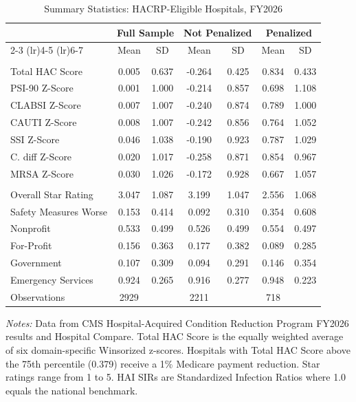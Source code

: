 \begin{table}[t]
\centering
\caption{Summary Statistics: HACRP-Eligible Hospitals, FY2026}
\label{tab:sumstats}
\begin{threeparttable}
\small
\begin{tabular}{lcccccc}
\toprule
& \multicolumn{2}{c}{Full Sample} & \multicolumn{2}{c}{Not Penalized} & \multicolumn{2}{c}{Penalized} \\
\cmidrule(lr){2-3} \cmidrule(lr){4-5} \cmidrule(lr){6-7}
& Mean & SD & Mean & SD & Mean & SD \\
\midrule
\addlinespace[3pt]
\multicolumn{7}{l}{\textit{Panel A: HAC Scores}} \\
\addlinespace[2pt]
Total HAC Score & 0.005 & 0.637 & -0.264 & 0.425 & 0.834 & 0.433 \\
PSI-90 Z-Score & 0.001 & 1.000 & -0.214 & 0.857 & 0.698 & 1.108 \\
CLABSI Z-Score & 0.007 & 1.007 & -0.240 & 0.874 & 0.789 & 1.000 \\
CAUTI Z-Score & 0.008 & 1.007 & -0.242 & 0.856 & 0.764 & 1.052 \\
SSI Z-Score & 0.046 & 1.038 & -0.190 & 0.923 & 0.787 & 1.029 \\
C. diff Z-Score & 0.020 & 1.017 & -0.258 & 0.871 & 0.854 & 0.967 \\
MRSA Z-Score & 0.030 & 1.026 & -0.172 & 0.928 & 0.667 & 1.057 \\
\addlinespace[3pt]
\multicolumn{7}{l}{\textit{Panel B: Hospital Characteristics}} \\
\addlinespace[2pt]
Overall Star Rating & 3.047 & 1.087 & 3.199 & 1.047 & 2.556 & 1.068 \\
Safety Measures Worse & 0.153 & 0.414 & 0.092 & 0.310 & 0.354 & 0.608 \\
Nonprofit & 0.533 & 0.499 & 0.526 & 0.499 & 0.554 & 0.497 \\
For-Profit & 0.156 & 0.363 & 0.177 & 0.382 & 0.089 & 0.285 \\
Government & 0.107 & 0.309 & 0.094 & 0.291 & 0.146 & 0.354 \\
Emergency Services & 0.924 & 0.265 & 0.916 & 0.277 & 0.948 & 0.223 \\
\midrule
Observations & 2929 & & 2211 & & 718 & \\
\bottomrule
\end{tabular}
\begin{tablenotes}
\footnotesize
\item \textit{Notes:} Data from CMS Hospital-Acquired Condition Reduction Program FY2026 results and Hospital Compare. Total HAC Score is the equally weighted average of six domain-specific Winsorized z-scores. Hospitals with Total HAC Score above the 75th percentile (0.379) receive a 1\% Medicare payment reduction. Star ratings range from 1 to 5. HAI SIRs are Standardized Infection Ratios where 1.0 equals the national benchmark.
\end{tablenotes}
\end{threeparttable}
\end{table}
